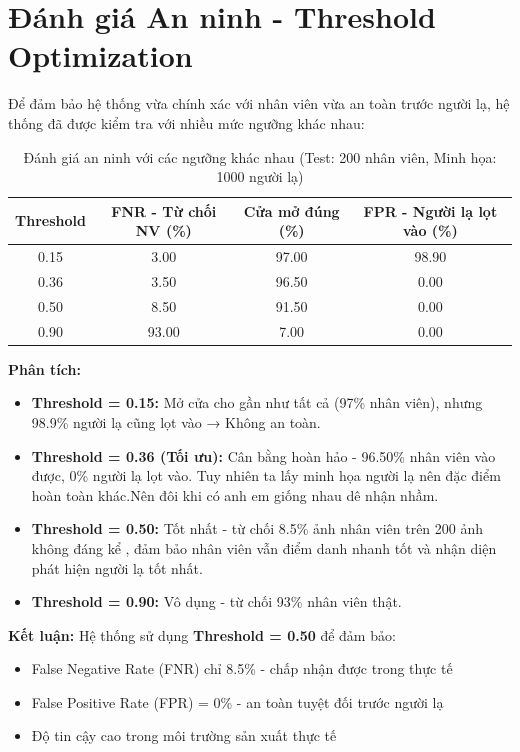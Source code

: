 \documentclass[a4paper]{book}
\begin{document}
\section{Đánh giá An ninh - Threshold Optimization}

Để đảm bảo hệ thống vừa chính xác với nhân viên vừa an toàn trước người lạ, hệ thống đã được kiểm tra với nhiều mức ngưỡng khác nhau:

\begin{table}[h!]
    \centering
    \small
    \begin{tabular}{cccc}
        \hline
        \textbf{Threshold} & \textbf{FNR - Từ chối NV (\%)} & \textbf{Cửa mở đúng (\%)} & \textbf{FPR - Người lạ lọt vào (\%)} \\
        \hline
        0.15 & 3.00  & 97.00 & 98.90 \\
        0.36 & 3.50  & 96.50 & 0.00 \\
        0.50 & 8.50  & 91.50 & 0.00 \\
        0.90 & 93.00 & 7.00  & 0.00 \\
        \hline
    \end{tabular}
    \caption{Đánh giá an ninh với các ngưỡng khác nhau (Test: 200 nhân viên, Minh họa: 1000 người lạ)}
    \label{tab:security-threshold}
\end{table}

\textbf{Phân tích:}
\begin{itemize}
    \item \textbf{Threshold = 0.15:} Mở cửa cho gần như tất cả (97\% nhân viên), nhưng 98.9\% người lạ cũng lọt vào → Không an toàn.
    
    \item \textbf{Threshold = 0.36 (Tối ưu):} Cân bằng hoàn hảo - 96.50\% nhân viên vào được, 0\% người lạ lọt vào. Tuy nhiên ta lấy minh họa người lạ nên đặc điểm hoàn toàn khác.Nên đôi khi có anh em giống nhau dê nhận nhầm.
    
    \item \textbf{Threshold = 0.50:} Tốt nhất - từ chối 8.5\% ảnh nhân viên trên 200 ảnh không đáng kể , đảm bảo nhân viên vẫn điểm danh nhanh tốt và nhận diện phát hiện người lạ tốt nhất.
    
    \item \textbf{Threshold = 0.90:} Vô dụng - từ chối 93\% nhân viên thật.
\end{itemize}

\textbf{Kết luận:} Hệ thống sử dụng \textbf{Threshold = 0.50} để đảm bảo:
\begin{itemize}
    \item False Negative Rate (FNR) chỉ 8.5\% - chấp nhận được trong thực tế
    \item False Positive Rate (FPR) = 0\% - an toàn tuyệt đối trước người lạ
    \item Độ tin cậy cao trong môi trường sản xuất thực tế
\end{itemize}
\end{document}
